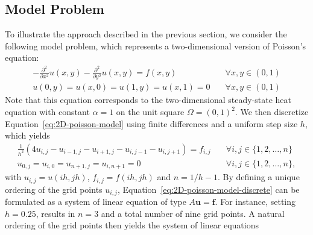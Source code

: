 \subsection{Model Problem}
To illustrate the approach described in the previous section, we consider the following model problem, which represents a two-dimensional version of Poisson's equation:
\begin{equation}
	\begin{split}
		-\frac{\partial^2}{\partial x^2} u(x,y) - \frac{\partial^2}{\partial y^2} u(x,y) = f(x, y) \quad & \forall x, y \in (0, 1) \\
		u(0, y) = u(x, 0) = u(1, y) = u(x, 1) = 0 \quad & \forall x, y \in (0, 1)
	\end{split}
	\label{eq:2D-poisson-model}
\end{equation}
Note that this equation corresponds to the two-dimensional steady-state heat equation with constant $\alpha = 1$ on the unit square $\Omega = ( 0, 1 )^2$.
We then discretize Equation~\eqref{eq:2D-poisson-model} using finite differences and a uniform step size $h$, which yields
\begin{equation}
	\begin{split}
		\frac{1}{h^2} (4 u_{i,j} - u_{i-1, j} - u_{i+1, j} - u_{i, j-1} - u_{i, j+1}) = f_{i, j} \quad & \forall i, j \in \{1, 2, \dots, n\} \\
		u_{0, j} = u_{i, 0} = u_{n+1, j} = u_{i, n+1} = 0 \quad & \forall i, j \in \{1, 2, \dots, n\},
	\end{split} 
	\label{eq:2D-poisson-model-discrete}
\end{equation}
with $u_{i,j} = u(ih, jh)$, $f_{i,j} = f(ih, jh)$ and $n = 1/h - 1$.
By defining a unique ordering of the grid points $u_{i, j}$, Equation~\eqref{eq:2D-poisson-model-discrete} can be formulated as a system of linear equation of type $A \bm{u} = \bm{f}$. 
For instance, setting $h = 0.25$, results in $n = 3$ and a total number of nine grid points.
A natural ordering of the grid points then yields the system of linear equations
